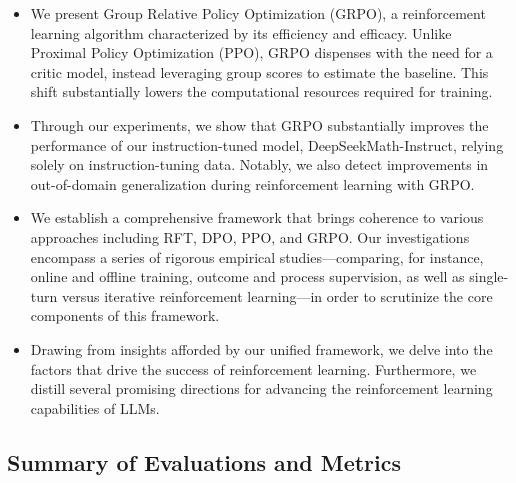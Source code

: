 \begin{itemize}[topsep=0pt]
    \item We present Group Relative Policy Optimization (GRPO), a reinforcement learning algorithm characterized by its efficiency and efficacy. Unlike Proximal Policy Optimization (PPO), GRPO dispenses with the need for a critic model, instead leveraging group scores to estimate the baseline. This shift substantially lowers the computational resources required for training.
    \item Through our experiments, we show that GRPO substantially improves the performance of our instruction-tuned model, DeepSeekMath-Instruct, relying solely on instruction-tuning data. Notably, we also detect improvements in out-of-domain generalization during reinforcement learning with GRPO.
    \item We establish a comprehensive framework that brings coherence to various approaches including RFT, DPO, PPO, and GRPO. Our investigations encompass a series of rigorous empirical studies—comparing, for instance, online and offline training, outcome and process supervision, as well as single-turn versus iterative reinforcement learning—in order to scrutinize the core components of this framework.
    \item Drawing from insights afforded by our unified framework, we delve into the factors that drive the success of reinforcement learning. Furthermore, we distill several promising directions for advancing the reinforcement learning capabilities of LLMs.
\end{itemize}

\subsection{Summary of Evaluations and Metrics}

